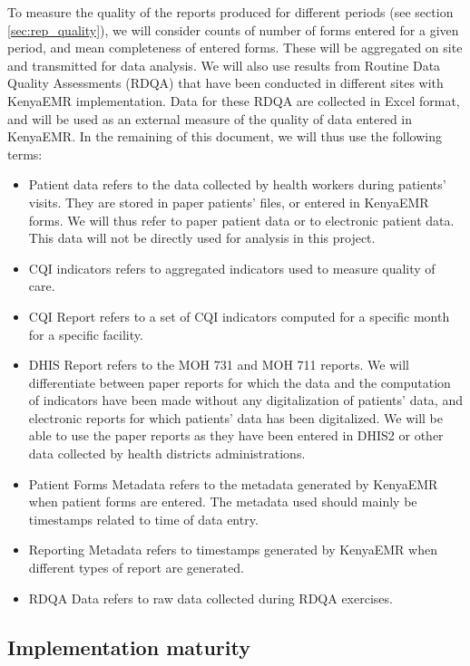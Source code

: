 \documentclass[a4paper,11pt,draft,twoside]{article}
\begin{document}
To measure the quality of the reports produced for different periods (see section \ref{sec:rep_quality}), we will consider counts of number of forms entered for a given period, and mean completeness of entered forms. These will be aggregated on site and transmitted for data analysis. We will also use results from Routine Data Quality Assessments (RDQA) that have been conducted in different sites with KenyaEMR implementation. Data for these RDQA are collected in Excel format, and will be used as an external measure of the quality of data entered in KenyaEMR.
In the remaining of this document, we will thus use the following terms:
\begin{itemize}
\item Patient data refers to the data collected by health workers during patients’ visits. They are stored in paper patients’ files, or entered in KenyaEMR forms. We will thus refer to paper patient data or to electronic patient data. This data will not be directly used for analysis in this project.
\item CQI indicators refers to aggregated indicators used to measure quality of care.
\item CQI Report refers to a set of CQI indicators computed for a specific month for a specific facility.
\item DHIS Report refers to the MOH 731 and MOH 711 reports. We will differentiate between paper reports for which the data and the computation of indicators have been made without any digitalization of patients’ data, and electronic reports for which patients’ data has been digitalized. We will be able to use the paper reports as they have been entered in DHIS2 or other data collected by health districts administrations.
\item Patient Forms Metadata refers to the metadata generated by KenyaEMR when patient forms are entered. The metadata used should mainly be timestamps related to time of data entry.
\item Reporting Metadata refers to timestamps generated by KenyaEMR when different types of report are generated.
\item RDQA Data refers to raw data collected during RDQA exercises.
\end{itemize}

    \subsection{Implementation maturity}
    \label{sec:maturity}
\end{document}
